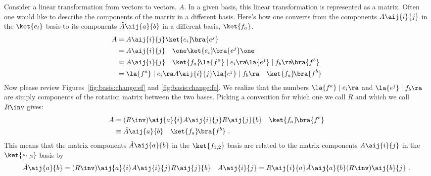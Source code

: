 \begin{subappendices}
Consider a linear transformation from vectors to vectors, $A$. In a given basis, this linear transformation is represented as a matrix. Often one would like to describe the components of the matrix in a different basis. Here's how one converts from the components $A\aij{i}{j}$ in the $\ket{e_{i}}$ basis to its components $\tilde A\aij{a}{b}$ in a different basis, $\ket{f_a}$.
\begin{align}
    A &= A\aij{i}{j}\ket{e_i}\!\bra{e^j}
    \\&=
    A\aij{i}{j}\quad
    \one
    \ket{e_i}\!\bra{e^j}
    \one
    \\&=
    A\aij{i}{j}\quad
    \ket{f_a}\!\la {f^a} \mid 
     {e_i} \ra\!  \la {e^j} \mid
    {f_b}\ra \!\bra{f^b}
    \\&=
    \la {f^a} \mid 
     {e_i} \ra
    A\aij{i}{j}
    \la {e^j} \mid
    {f_b}\ra
    \quad
    \ket{f_a}\!\bra{f^b}
\end{align}
Now please review Figures~\ref{fig:basis:change:ef} and \ref{fig:basis:change:fe}. We realize that the numbers $\la {f^a} \mid 
     {e_i} \ra$ and $\la {e^j} \mid
    {f_b}\ra$ are simply components of the rotation matrix between the two bases. Picking a convention for which one we call $R$ and which we call $R\inv$ gives:
\begin{align}
    A &= (R\inv)\aij{a}{i}
    A\aij{i}{j}
    R\aij{j}{b}
    \quad
    \ket{f_a}\!\bra{f^b} 
    \\&\equiv
    \tilde A\aij{a}{b}
    \quad
    \ket{f_a}\!\bra{f^b}
    \ .
\end{align}
This means that the matrix components $\hat A\aij{a}{b}$ in the $\ket{f_{1,2}}$ basis are related to the matrix components $A\aij{i}{j}$ in the $\ket{e_{1,2}}$ basis by
\begin{align}
    \tilde A\aij{a}{b} &= (R\inv)\aij{a}{i}
    A\aij{i}{j}
    R\aij{j}{b}
    &
    A\aij{i}{j} = R\aij{i}{a}\tilde A\aij{a}{b}(R\inv)\aij{b}{j} \ .
\end{align}




\end{subappendices}
